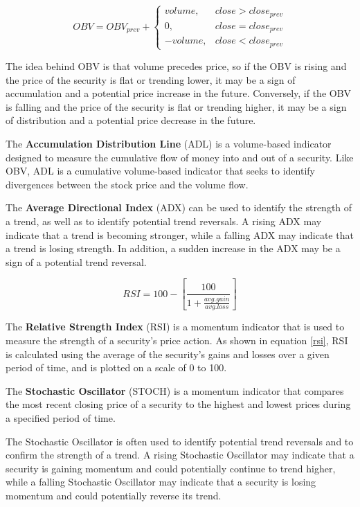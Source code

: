\documentclass[conference,compsoc]{IEEEtran}
\begin{document}
\begin{equation} \label{obv}
    OBV = OBV_{prev} +
        \begin{cases}
            volume, & close > close_{prev}\\
            0, & close = close_{prev}\\
            -volume, & close < close_{prev}
        \end{cases}
\end{equation}

The idea behind OBV is that volume precedes price, so if the OBV is rising and the price of the security is flat or trending lower, it may be a sign of accumulation and a potential price increase in the future. 
%
Conversely, if the OBV is falling and the price of the security is flat or trending higher, it may be a sign of distribution and a potential price decrease in the future.

The \textbf{Accumulation Distribution Line} (ADL) is a volume-based indicator designed to measure the cumulative flow of money into and out of a security.
%
Like OBV, ADL is a cumulative volume-based indicator that seeks to identify divergences between the stock price and the volume flow. 

The \textbf{Average Directional Index} (ADX) can be used to identify the strength of a trend, as well as to identify potential trend reversals. 
%
A rising ADX may indicate that a trend is becoming stronger, while a falling ADX may indicate that a trend is losing strength. 
%
In addition, a sudden increase in the ADX may be a sign of a potential trend reversal.

\begin{equation} \label{rsi}
    RSI = 100 - \left [ \frac{100}{1 + \frac{avg.gain}{avg.loss}} \right ]    
\end{equation}

The \textbf{Relative Strength Index} (RSI) is a momentum indicator that is used to measure the strength of a security's price action. 
%
As shown in equation \ref{rsi}, RSI is calculated using the average of the security's gains and losses over a given period of time, and is plotted on a scale of 0 to 100.

The \textbf{Stochastic Oscillator} (STOCH) is a momentum indicator that compares the most recent closing price of a security to the highest and lowest prices during a specified period of time. 

The Stochastic Oscillator is often used to identify potential trend reversals and to confirm the strength of a trend. 
%
A rising Stochastic Oscillator may indicate that a security is gaining momentum and could potentially continue to trend higher, while a falling Stochastic Oscillator may indicate that a security is losing momentum and could potentially reverse its trend.
\end{document}
